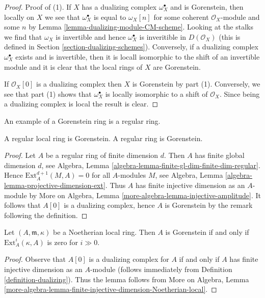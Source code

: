 \begin{proof}
Proof of (1).
If $X$ has a dualizing complex $\omega_X^\bullet$ and is Gorenstein, then
locally on $X$ we see that $\omega_X^\bullet$ is equal to $\omega_X[n]$
for some coherent $\mathcal{O}_X$-module and some $n$ by
Lemma \ref{lemma-dualizing-module-CM-scheme}. Looking at the stalks
we find that $\omega_X$ is invertible and hence $\omega_X^\bullet$
is inveritible in $D(\mathcal{O}_X)$ (this is defined in
Section \ref{section-dualizing-schemes}). Conversely, if a
dualizing complex $\omega_X^\bullet$ exists and is invertible,
then it is locall isomorphic
to the shift of an invertible module and it is clear that the local
rings of $X$ are Gorenstein.

\medskip\noindent
If $\mathcal{O}_X[0]$ is a dualizing complex then $X$ is Gorenstein by
part (1). Conversely, we see that part (1) shows that
$\omega_X^\bullet$ is locally isomorphic to a shift of $\mathcal{O}_X$.
Since being a dualizing complex is local the result is clear.
\end{proof}

\noindent
An example of a Gorenstein ring is a regular ring.

\begin{lemma}
\label{lemma-regular-gorenstein}
A regular local ring is Gorenstein.
A regular ring is Gorenstein.
\end{lemma}

\begin{proof}
Let $A$ be a regular ring of finite dimension $d$. Then $A$ has finite
global dimension $d$, see
Algebra, Lemma \ref{algebra-lemma-finite-gl-dim-finite-dim-regular}.
Hence $\text{Ext}^{d + 1}_A(M, A) = 0$ for all $A$-modules $M$, see
Algebra, Lemma \ref{algebra-lemma-projective-dimension-ext}.
Thus $A$ has finite injective dimension as an $A$-module by
More on Algebra, Lemma \ref{more-algebra-lemma-injective-amplitude}.
It follows that $A[0]$ is a dualizing complex, hence $A$ is
Gorenstein by the remark following the definition.
\end{proof}

\begin{lemma}
\label{lemma-gorenstein-ext}
Let $(A, \mathfrak m, \kappa)$ be a Noetherian local ring.
Then $A$ is Gorenstein if and only if $\text{Ext}^i_A(\kappa, A)$
is zero for $i \gg 0$.
\end{lemma}

\begin{proof}
Observe that $A[0]$ is a dualizing complex for $A$ if and only
if $A$ has finite injective dimension as an $A$-module
(follows immediately from Definition \ref{definition-dualizing}).
Thus the lemma follows from More on Algebra, Lemma
\ref{more-algebra-lemma-finite-injective-dimension-Noetherian-local}.
\end{proof}


